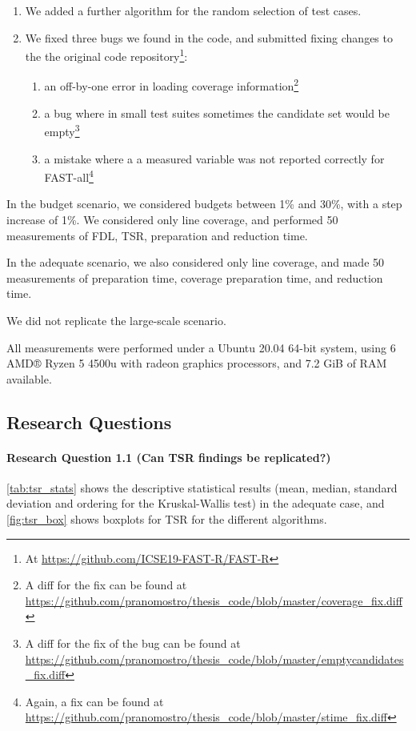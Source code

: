 \begin{enumerate}
\item We added a further algorithm for the random selection of test cases.
\item We fixed three bugs we found in the code, and submitted fixing changes to the the original code repository\footnote{At \url{https://github.com/ICSE19-FAST-R/FAST-R}}:
	\begin{enumerate}
	\item an off-by-one error in loading coverage information\footnote{A diff for the fix can be found at \url{https://github.com/pranomostro/thesis_code/blob/master/coverage_fix.diff}}
	\item a bug where in small test suites sometimes the candidate set would be empty\footnote{A diff for the fix of the bug can be found at \url{https://github.com/pranomostro/thesis_code/blob/master/emptycandidates_fix.diff}}
	\item a mistake where a a measured variable was not reported correctly for FAST-all\footnote{Again, a fix can be found at \url{https://github.com/pranomostro/thesis_code/blob/master/stime_fix.diff}}
	\end{enumerate}
\end{enumerate}

In the budget scenario, we considered budgets between 1\% and 30\%, with
a step increase of 1\%. We considered only line coverage, and performed
50 measurements of FDL, TSR, preparation and reduction time.

In the adequate scenario, we also considered only line coverage, and
made 50 measurements of preparation time, coverage preparation time,
and reduction time.

We did not replicate the large-scale scenario.

All measurements were performed under a Ubuntu 20.04 64-bit system,
using 6 AMD® Ryzen 5 4500u with radeon graphics processors, and 7.2
GiB of RAM available.

\subsection{Research Questions}

\paragraph{Research Question 1.1 (Can TSR findings be replicated?)}

\autoref{tab:tsr_stats} shows the descriptive statistical results (mean,
median, standard deviation and ordering for the Kruskal-Wallis test)
in the adequate case, and \autoref{fig:tsr_box} shows boxplots for TSR
for the different algorithms.

